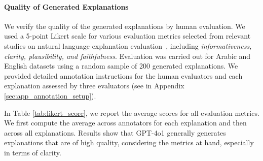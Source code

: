 \paragraph{Quality of Generated Explanations}
We verify the quality of the generated explanations by human evaluation. We used a 5-point Likert scale for various evaluation metrics selected from relevant studies on natural language explanation evaluation~\cite{huang-etal-2024-chatgpt,10.1145/3543873.3587368,10.1145/3613904.3642805}, including \textit{informativeness, clarity, plausibility, and faithfulness}. %
Evaluation was carried out for Arabic and English datasets using a random sample of 200 generated explanations. 
We provided detailed annotation instructions %
for the human evaluators and 
each explanation assessed by three evaluators (see in Appendix \ref{sec:app_annotation_setup}).

In Table \ref{tab:likert_score}, we report the average scores for all evaluation metrics. We first compute the average across annotators for each explanation and then across all explanations. Results show that GPT-4o1 generally generates explanations that are of high quality, considering the metrics at hand, especially in terms of clarity. 



